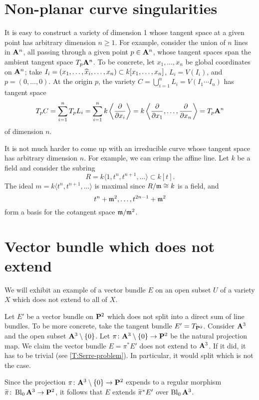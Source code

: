 \section{Non-planar curve singularities}

It is easy to construct a variety of dimension 1 whose tangent space at a given point has arbitrary dimension $n \geq 1$. For example, consider the union of $n$ lines in $\mathbf{A}^n$, all passing through a given point $p \in \mathbf{A}^n$, whose tangent spaces span the ambient tangent space $T_p \mathbf{A}^n$. To be concrete, let $x_1, \dots, x_n$ be global coordinates on $\mathbf{A}^n$; take $I_i = (x_1, \dots, \widehat{x}_i, \dots, x_n) \subset k[x_1, \dots, x_n]$, $L_i = V(I_i)$, and $p = (0, \dots, 0)$. At the origin $p$, the variety $C = \bigcup_{i=1}^n L_i = V(I_1 \cdots I_n)$ has tangent space
\[
T_p C =
\sum_{i=1}^n T_p L_i =
\sum_{i=1}^n k \left\langle \frac{\partial}{\partial x_i} \right\rangle =
k \left\langle \frac{\partial}{\partial x_1}, \dots, \frac{\partial}{\partial x_n} \right\rangle =
T_p \mathbf{A}^n
\]
of dimension $n$.

It is not much harder to come up with an irreducible curve whose tangent space has arbitrary dimension $n$. For example, we can crimp the affine line. Let $k$ be a field and consider the subring
\[
R = k \langle 1, t^n, t^{n+1}, \dots \rangle
\subset k[t].
\]
The ideal $m = k\langle t^n, t^{n+1}, \dots \rangle$ is maximal since $R/\mathfrak{m} \cong k$ is a field, and
\[
t^n + \mathfrak{m}^2, \dots, t^{2n-1} + \mathfrak{m}^2
\]
form a basis for the cotangent space $\mathfrak{m}/\mathfrak{m}^2$.


\section{Vector bundle which does not extend}

We will exhibit an example of a vector bundle $E$ on an open subset $U$ of a variety $X$ which does not extend to all of $X$.

Let $E'$ be a vector bundle on $\mathbf{P}^2$ which does not split into a direct sum of line bundles. To be more concrete, take the tangent bundle $E' = T_{\mathbf{P}^2}$. Consider $\mathbf{A}^3$ and the open subset $\mathbf{A}^3 \setminus \{0\}$. Let $\pi \cn \Abb^3 \setminus \{0\} \rarr \Pbb^2$ be the natural projection map. We claim the vector bundle $E = \pi^\ast E'$ does not extend to $\mathbf{A}^3$. If it did, it has to be trivial (see \ref{T:Serre-problem}). In particular, it would split which is not the case.

Since the projection $\pi \cn \Abb^3 \setminus \{0\} \rarr \Pbb^2$ expends to a regular morphism $\wtilde{\pi} \cn \Bl_0 \Abb^3 \rarr \Pbb^2$, it follows that $E$ extends $\widetilde{\pi}^\ast E'$ over $\operatorname{Bl}_0 \mathbf{A}^3$.

